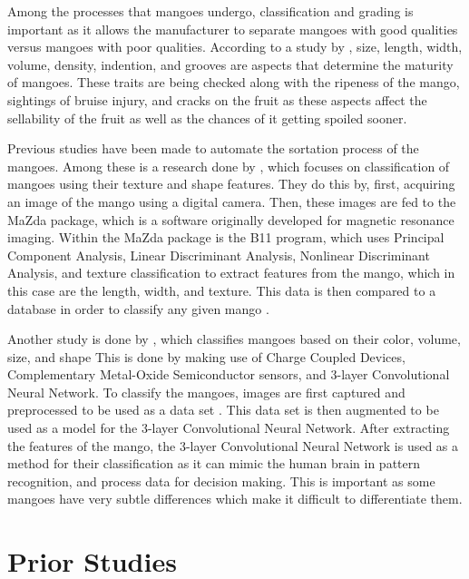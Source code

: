 Among the processes that mangoes undergo, classification and grading is important as it allows the manufacturer to separate mangoes with good qualities versus mangoes with poor qualities. According to a study by \citep{lacap-bruise-2021}, size, length, width, volume, density, indention, and grooves are aspects that determine the maturity of mangoes. These traits are being checked along with the ripeness of the mango, sightings of bruise injury, and cracks on the fruit \citep{lacap-bruise-2021} as these aspects affect the sellability of the fruit as well as the chances of it getting spoiled sooner.

Previous studies have been made to automate the sortation process of the mangoes. Among these is a research done by \citet{abbas-mango-2018}, which focuses on classification of mangoes using their texture and shape features. They do this by, first, acquiring an image of the mango using a digital camera. Then, these images are fed to the MaZda package, which is a software originally developed for magnetic resonance imaging. Within the MaZda package is the B11 program, which uses Principal Component Analysis, Linear Discriminant Analysis, Nonlinear Discriminant Analysis, and texture classification to extract features from the mango, which in this case are the length, width, and texture. This data is then compared to a database in order to classify any given mango \citep{abbas-mango-2018}.  

Another study is done by \citet{rizwan-iqbal-classification-2022}, which classifies mangoes based on their color, volume, size, and shape This is done by making use of Charge Coupled Devices, Complementary Metal-Oxide Semiconductor sensors, and 3-layer Convolutional Neural Network. To classify the mangoes, images are first captured and preprocessed to be used as a data set \citep{rizwan-iqbal-classification-2022}. This data set is then augmented to be used as a model for the 3-layer Convolutional Neural Network. After extracting the features of the mango, the 3-layer Convolutional Neural Network is used as a method for their classification as it can mimic the human brain in pattern recognition, and process data for decision making. This is important as some mangoes have very subtle differences which make it difficult to differentiate them.



\section{Prior Studies}

